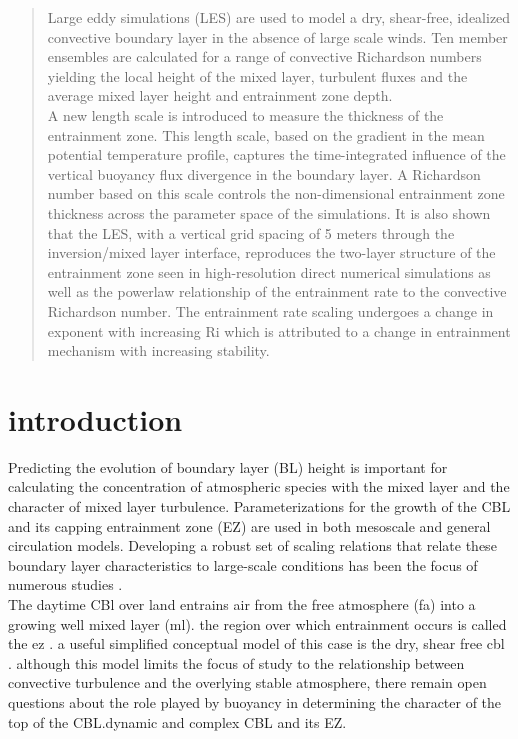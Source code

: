 \documentclass[referee]{svjour3}
\begin{document}
\begin{abstract}

Large eddy simulations (LES) are used to  model a dry, shear-free, idealized convective boundary layer in the absence of large scale winds.  Ten member ensembles are calculated for a range of convective  Richardson numbers yielding the local height of the mixed layer, turbulent fluxes  and the average mixed layer height and entrainment zone depth. \\

A new length scale is introduced to measure the thickness of the entrainment zone.  This length scale, based on the gradient in the mean potential temperature profile, captures the time-integrated influence of the vertical buoyancy flux divergence in the boundary layer.  A Richardson number based on this scale controls the non-dimensional entrainment zone thickness across the parameter space of the simulations.   It is also shown that the LES, with a vertical grid spacing of 5 meters through the inversion/mixed layer interface, reproduces the two-layer structure of the entrainment zone seen in high-resolution direct numerical simulations as well as the powerlaw relationship of the entrainment rate to the convective Richardson number.  The entrainment rate scaling undergoes a change in exponent with increasing Ri which is attributed to a change in entrainment mechanism with increasing stability.

\end{abstract}

\section{introduction}
\label{intro}

Predicting the evolution of boundary layer (BL) height is important for calculating the concentration of atmospheric species with the mixed layer and the character of mixed layer turbulence.  Parameterizations for the growth of the  CBL and its capping entrainment zone (EZ) are used in both mesoscale and general circulation models.  Developing a robust set of scaling relations that relate these boundary layer characteristics to large-scale conditions has been the focus of numerous studies
 \citep[e.g.][]{Stull-BLMetIntro, Traum11, SteynBaldHoff, StullNelEl, Sorbjan1}.\\

The daytime CBl over land entrains air from the free atmosphere (fa) into a growing well mixed layer (ml).  the region over which entrainment occurs is called the ez \citep{Dearwill80}. a useful simplified conceptual model of this case is the dry, shear free cbl \citep{Sullivan98, Fedorovich04, Brooks12}. although this model limits the focus of study to the relationship between convective turbulence and the overlying stable atmosphere, there remain open questions about the role played by buoyancy in determining the character of the top of the CBL.dynamic and complex CBL and its EZ.\\  
\end{document}
